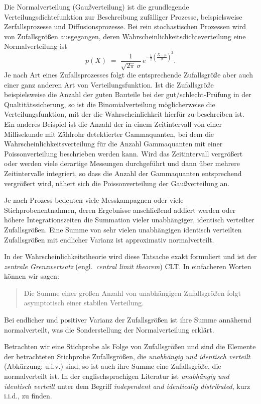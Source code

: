 Die Normalverteilung (Gaußverteilung) ist die grundlegende Verteilungsdichtefunktion
zur Beschreibung zufälliger Prozesse, beispielsweise Zerfallsprozesse und Diffusionsprozesse.
Bei rein stochastischen Prozessen wird von Zufallsgrößen ausgegangen, deren
Wahrscheinlichkeitsdichteverteilung eine Normalverteilung ist
\begin{equation}
p(X) \; = \; \frac{1}{\sqrt{2 \pi} \, \sigma} \, e^{-\frac{1}{2}\left(\frac{X - \mu}{\sigma}\right)^2}.
\end{equation}
Je nach Art eines Zufallsprozesses folgt die entsprechende Zufallsgröße aber auch einer ganz
anderen Art von Verteilungsfunktion. Ist die Zufallsgröße beispielsweise die Anzahl der
guten Bauteile bei der gut/schlecht-Prüfung in der Qualtitätssicherung, so ist die
Binomialverteilung möglicherweise die Verteilungsfunktion, mit der die Wahrscheinlichkeit hierfür
zu beschreiben ist. Ein anderes Beispiel ist die Anzahl der in einem Zeitintervall von
einer Millisekunde mit Zählrohr detektierter Gammaquanten, bei dem die Wahrscheinlichkeitsverteilung
für die Anzahl Gammaquanten mit einer Poissonverteilung beschrieben werden kann.
Wird das Zeitintervall vergrößert oder werden viele derartige Messungen durchgeführt und
dann über mehrere Zeitintervalle integriert, so dass die Anzahl der Gammaquanten entsprechend
vergrößert wird, nähert sich die Poissonverteilung der Gaußverteilung an.

Je nach Prozess bedeuten viele Messkampagnen oder viele Stichprobenentnahmen,
deren Ergebnisse anschließend addiert werden oder höhere Integrationszeiten die
Summation vieler unabhängiger, identisch verteilter Zufallsgrößen. Eine Summe von sehr
vielen unabhängigen identisch verteilten Zufallsgrößen mit endlicher Varianz
ist approximativ normalverteilt.

In der Wahrscheinlichkeitstheorie wird diese Tatsache exakt formuliert und ist der
\textsl{zentrale Grenzwertsatz} (engl.\ \textsl{central limit theorem}) CLT.
In einfacheren Worten können wir sagen:
\begin{quote}
Die Summe einer großen Anzahl von unabhängigen Zufallsgrößen folgt
asymptotisch einer stabilen Verteilung.
\label{zentralesGrenzwerttheorem}
\end{quote}
Bei endlicher und positiver Varianz der Zufallsgrößen ist ihre Summe annähernd
normalverteilt, was die Sonderstellung der Normalverteilung erklärt.

Betrachten wir eine Stichprobe als Folge von Zufallsgrößen und sind die Elemente
der betrachteten Stichprobe Zufallsgrößen, die \textsl{unabhängig und identisch verteilt} (Abkürzung: u.i.v.)
sind, so ist auch ihre Summe eine Zufallsgröße, die normalverteilt ist.
In der englischsprachigen Literatur ist
\textsl{unabhängig und identisch verteilt} unter dem Begriff
\textsl{independent and identically distributed}, kurz i.i.d., zu finden.

